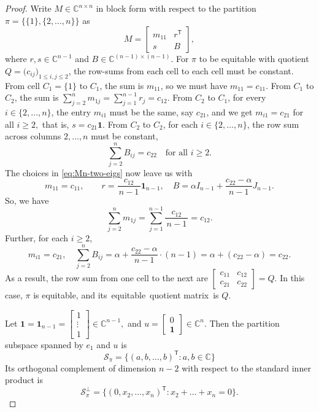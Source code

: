 \documentclass[10pt,a4paper]{amsart}
\begin{document}
\begin{proof}
	Write $M\in \mathbb{C}^{n\times n}$ in block form with respect to the partition $\pi=\{\{1\},\{2,\dots,n\}\}$ as
	$$
	M
	=
	\begin{bmatrix}
		m_{11} & r^\mathsf{T}\\
		s & B
	\end{bmatrix},
	$$
	where $r,s\in\mathbb{C}^{n-1}$ and $B\in\mathbb{C}^{(n-1)\times(n-1)}$. For $\pi$ to be equitable with quotient $Q=\bigl(c_{ij}\bigr)_{1\le i,j\le 2}$, the row-sums from each cell to each cell must be constant.  From cell $C_1=\{1\}$ to $C_1$, the sum is $m_{11}$, so we must have $m_{11} = c_{11}.$  From $C_1$ to $C_2$,  the sum is  $\sum_{j=2}^n m_{1j} = \sum_{j=1}^{n-1} r_j = c_{12}.$ From $C_2$ to $C_1$, for every $i\in\{2,\dots,n\}$, the entry $m_{i1}$ must be the same, say $c_{21}$, and we get  $m_{i1}=c_{21}$ for all $i\ge 2,$ that is, $s=c_{21}\mathbf{1}$.  From $C_2$ to $C_2$, for each $i\in\{2,\dots,n\}$, the row sum across columns $2,\dots,n$ must be constant,
		$$
		\sum_{j=2}^n B_{ij} = c_{22}\quad\text{for all }i\ge 2.
		$$	
	The choices in \eqref{eq:Mn-two-eigs} now leave us with
	$$
	m_{11}=c_{11},\qquad
	r=\frac{c_{12}}{\,n-1\,}\mathbf{1}_{n-1},\quad
	B = \alpha I_{n-1} + \frac{c_{22}-\alpha}{\,n-1\,}J_{n-1}.
	$$
	So, we have
	$$
	\sum_{j=2}^n m_{1j} 
	= \sum_{j=1}^{n-1}\frac{c_{12}}{\,n-1\,}
	= c_{12}.
	$$
	Further, for each $i\ge 2$, 
	$$
	m_{i1}=c_{21},\quad
	\sum_{j=2}^n B_{ij}
	= \alpha + \frac{c_{22}-\alpha}{\,n-1\,}\cdot (n-1) 
	= \alpha + (c_{22}-\alpha)
	= c_{22}.
	$$
	As a result, the row sum from one cell to the next are $\begin{bmatrix}
		c_{11} & c_{12}\\
		c_{21} & c_{22}
	\end{bmatrix}
	=Q$. In this case, $\pi$ is equitable, and its equitable quotient matrix is $Q$.
	
	 	Let $\mathbf{1}=\mathbf{1}_{n-1}=\begin{bmatrix}1\\\vdots\\1\end{bmatrix}\in\mathbb{C}^{n-1},$ and $	u =\begin{bmatrix}0\\ \mathbf{1}\end{bmatrix}\in\mathbb{C}^{n}.$ Then  the partition subspace spanned by $e_1$ and $u$ is
	$$
	\mathcal{S}_\pi=\{(a,b,\dots,b)^\mathsf{T}:a,b\in\mathbb{C}\}
	$$
	 Its orthogonal complement of dimension $n-2$ with respect to the standard inner product is
	$$
	\mathcal{S}_\pi^\perp
	=
	\{(0,x_2,\dots,x_n)^\mathsf{T} : x_2+\dots+x_n=0\}.
	$$
	

\end{proof}
\end{document}
